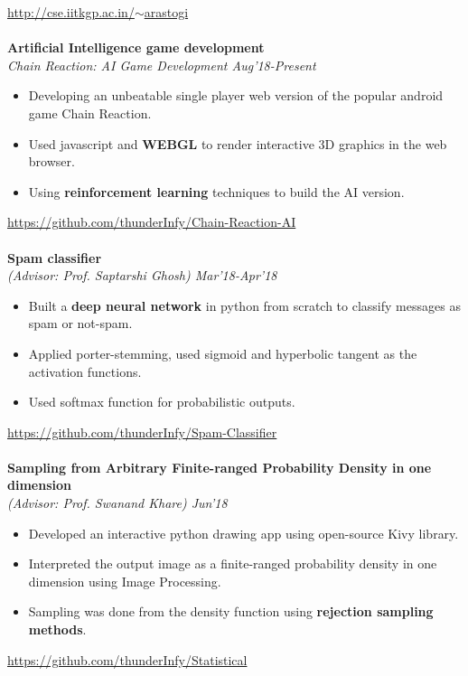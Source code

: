 \documentclass[letter,10pt]{book}
\begin{document}
\href{http://cse.iitkgp.ac.in/~arastogi}{http://cse.iitkgp.ac.in/$\sim$arastogi}
\\\\
\large \textbf{Artificial Intelligence game development} \normalsize\\
\emph{Chain Reaction: AI Game Development \hfill Aug'18-Present}
\enlargethispage{3\baselineskip}\\[-2em]
\begin{itemize}
\item Developing an unbeatable single player web version of the popular android game Chain Reaction.\\[-2em] 
\item Used javascript and  \textbf{WEBGL} to render interactive 3D graphics in the web browser. \\[-2em]
\item Using \textbf{reinforcement learning} techniques to build the AI version.\\[-1.8em] 
\end{itemize}
\href{https://github.com/thunderInfy/Chain-Reaction-AI}{https://github.com/thunderInfy/Chain-Reaction-AI}
\\\\
\large \textbf{Spam classifier} \normalsize\\
\emph{(Advisor: Prof. Saptarshi Ghosh) \hfill Mar'18-Apr'18} \\[-2em] 
\begin{itemize}
\item Built a  \textbf{deep neural network} in python from scratch to classify messages as spam or not-spam.\\[-2em]
\item Applied  porter-stemming, used sigmoid and hyperbolic tangent as the activation functions.\\[-2em] 
\item Used  softmax function for probabilistic outputs.\\[-1.8em]
\end{itemize}
\href{https://github.com/thunderInfy/Spam-Classifier}{https://github.com/thunderInfy/Spam-Classifier}
\\\\ \large \textbf{Sampling from Arbitrary Finite-ranged Probability Density in one dimension} \normalsize\\
\emph{(Advisor: Prof. Swanand Khare) \hfill Jun'18} \\[-2em] 
\begin{itemize}
\item Developed an interactive python drawing app using open-source Kivy library.\\[-2em]
\item Interpreted the output image as a finite-ranged probability density in one dimension using Image Processing.\\[-2em]
\item Sampling was done from the density function using  \textbf{rejection sampling methods}.\\[-1.8em]
\end{itemize}
\href{https://github.com/thunderInfy/Statistical}{https://github.com/thunderInfy/Statistical}
\end{document}
